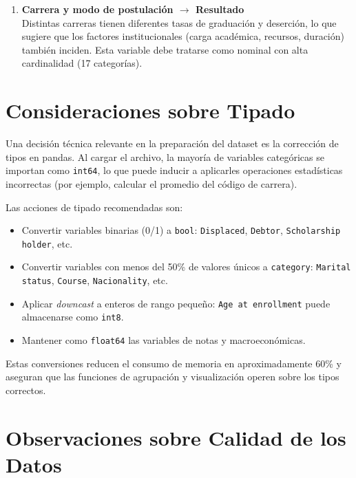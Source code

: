 \documentclass[11pt,a4paper]{article}
\begin{document}
\begin{enumerate}[leftmargin=*, label=\textbf{R\arabic*.}]
  \item \textbf{Carrera y modo de postulación $\rightarrow$ Resultado}\\
  Distintas carreras tienen diferentes tasas de graduación y deserción, lo que sugiere que
  los factores institucionales (carga académica, recursos, duración) también inciden. Esta
  variable debe tratarse como nominal con alta cardinalidad (17 categorías).

\end{enumerate}

\section{Consideraciones sobre Tipado}

Una decisión técnica relevante en la preparación del dataset es la corrección de tipos en
pandas. Al cargar el archivo, la mayoría de variables categóricas se importan como
\texttt{int64}, lo que puede inducir a aplicarles operaciones estadísticas incorrectas
(por ejemplo, calcular el promedio del código de carrera).

Las acciones de tipado recomendadas son:

\begin{itemize}
  \item Convertir variables binarias (0/1) a \texttt{bool}: \texttt{Displaced},
        \texttt{Debtor}, \texttt{Scholarship holder}, etc.
  \item Convertir variables con menos del 50\% de valores únicos a \texttt{category}:
        \texttt{Marital status}, \texttt{Course}, \texttt{Nacionality}, etc.
  \item Aplicar \textit{downcast} a enteros de rango pequeño:
        \texttt{Age at enrollment} puede almacenarse como \texttt{int8}.
  \item Mantener como \texttt{float64} las variables de notas y macroeconómicas.
\end{itemize}

Estas conversiones reducen el consumo de memoria en aproximadamente 60\% y aseguran que
las funciones de agrupación y visualización operen sobre los tipos correctos.

\section{Observaciones sobre Calidad de los Datos}
\end{document}

